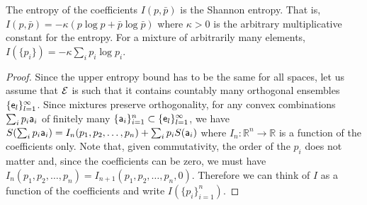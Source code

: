 \begin{mathSection}
\begin{thrm}\label{pm_es_entropyUnique}
	The entropy of the coefficients $I(p,\bar{p})$ is the Shannon entropy. That is, $I(p,\bar{p}) = - \kappa \left(p \log p + \bar{p} \log \bar{p}\right)$ where $\kappa>0$ is the arbitrary multiplicative constant for the entropy. For a mixture of arbitrarily many elements, $I(\{p_i\}) = - \kappa \sum_i p_i \log p_i$.
\end{thrm}

\begin{proof}
	Since the upper entropy bound has to be the same for all spaces, let us assume that $\Ens$ is such that it contains countably many orthogonal ensembles $\{\ens_l\}_{l=1}^{\infty}$. Since mixtures preserve orthogonality, for any convex combinations $\sum_i p_i \ens[a]_i$ of finitely many $\{\ens[a]_i\}_{i=1}^{n} \subset \{\ens_l\}_{l=1}^{\infty}$,  we have $S(\sum_i p_i \ens[a]_i ) = I_n(p_1, p_2, \dots, p_n) + \sum_i p_i S(\ens[a]_i)$ where $I_n : \mathbb{R}^n \to \mathbb{R}$ is a function of the coefficients only. Note that, given commutativity, the order of the $p_i$ does not matter and, since the coefficients can be zero, we must have $I_n(p_1, p_2, \dots, p_n) = I_{n+1}(p_1, p_2, \dots, p_n, 0)$. Therefore we can think of $I$ as a function of the coefficients and write $I(\{p_i\}_{i=1}^{n})$.
	

\end{proof}
\end{mathSection}
